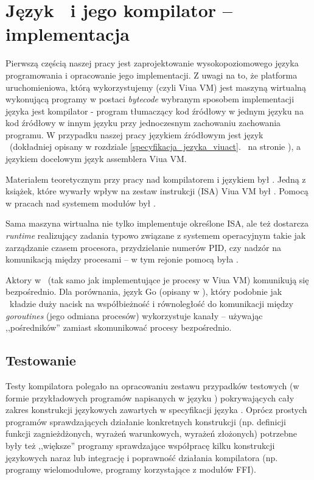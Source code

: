 \chapter{Język \ViuAct\ i jego kompilator -- implementacja}
\label{viuact_impl}
\label{jezyk_viuact_i_jego_kompilator}

Pierwszą częścią naszej pracy jest zaprojektowanie wysokopoziomowego języka programowania i opracowanie jego
implementacji. Z uwagi na to, że platforma uruchomieniowa, którą wykorzystujemy (czyli Viua VM) jest maszyną
wirtualną wykonującą programy w postaci \emph{bytecode} wybranym sposobem implementacji języka jest
kompilator - program tłumaczący kod źródłowy w jednym języku na kod źródłowy w innym języku przy jednoczesnym
zachowaniu zachowania programu. W przypadku naszej pracy językiem źródłowym jest język \ViuAct\ (dokładniej
opisany w rozdziale \ref{specyfikacja_jezyka_viuact}.~ na stronie
\pageref{specyfikacja_jezyka_viuact}), a językiem docelowym język assemblera Viua VM.

Materiałem teoretycznym przy pracy nad kompilatorem i językiem był \cite{ProgrammingLanguagePragmatics}.
Jedną z książek, które wywarły wpływ na zestaw instrukcji (ISA) Viua VM był \cite{RISCV}.
Pomocą w pracach nad systemem modułów był \cite{Linkers}.

Sama maszyna wirtualna nie tylko implementuje określone ISA, ale też dostarcza \emph{runtime} realizujący
zadania typowo związane z systemem operacyjnym takie jak zarządzanie czasem procesora, przydzielanie numerów
PID, czy nadzór na komunikacją między procesami -- w tym rejonie pomocą była \cite{OperatingSystems}.

Aktory w \ViuAct\ (tak samo jak implementujące je procesy w Viua VM) komunikują się bezpośrednio.
Dla porównania, język Go (opisany w \cite{Golang}), który podobnie jak \ViuAct\ kładzie duży nacisk na
współbieżność i równoległość do komunikacji między \emph{goroutines} (jego odmiana procesów) wykorzystuje
kanały -- używając ,,pośredników'' zamiast skomunikować procesy bezpośrednio.





\section{Testowanie}

Testy kompilatora polegało na opracowaniu zestawu przypadków testowych (w formie
przykładowych programów napisanych w języku \ViuAct) pokrywających cały zakres
konstrukcji językowych zawartych w specyfikacji języka \ViuAct. Oprócz prostych
programów sprawdzających działanie konkretnych konstrukcji (np. definicji
funkcji zagnieżdżonych, wyrażeń warunkowych, wyrażeń złożonych) potrzebne były
też ,,większe'' programy sprawdzające współpracę kilku konstrukcji językowych
naraz lub integrację i poprawność działania kompilatora (np. programy
wielomodułowe, programy korzystające z modułów FFI).

